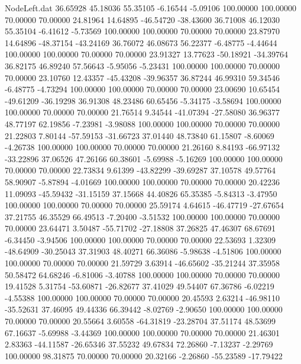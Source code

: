 \begin{filecontents}{NodeLeft.dat}
  36.65928   45.18036   55.35105    -6.16544   -5.09106  100.00000  100.00000   70.00000   70.00000   24.81964   14.64895  -46.54720  -38.43600
  36.71008   46.12030   55.35104    -6.41612   -5.73569  100.00000  100.00000   70.00000   70.00000   23.87970   14.64896  -48.37154  -43.24169
  36.76072   46.08673   56.22377    -6.48775   -4.44644  100.00000  100.00000   70.00000   70.00000   23.91327   13.77623  -50.18921  -34.39764
  36.82175   46.89240   57.56643    -5.95056   -5.23431  100.00000  100.00000   70.00000   70.00000   23.10760   12.43357  -45.43208  -39.96357
  36.87244   46.99310   59.34546    -6.48775   -4.73294  100.00000  100.00000   70.00000   70.00000   23.00690   10.65454  -49.61209  -36.19298
  36.91308   48.23486   60.65456    -5.34175   -3.58694  100.00000  100.00000   70.00000   70.00000   21.76514    9.34544  -41.07394  -27.58080
  36.96377   48.77197   62.19856    -7.23981   -3.98088  100.00000  100.00000   70.00000   70.00000   21.22803    7.80144  -57.59153  -31.66723
  37.01440   48.73840   61.15807    -8.60069   -4.26738  100.00000  100.00000   70.00000   70.00000   21.26160    8.84193  -66.97132  -33.22896
  37.06526   47.26166   60.38601    -5.69988   -5.16269  100.00000  100.00000   70.00000   70.00000   22.73834    9.61399  -43.82299  -39.69287
  37.10578   49.57764   58.90907    -5.87894   -4.01669  100.00000  100.00000   70.00000   70.00000   20.42236   11.09093  -45.59432  -31.15159
  37.15668   44.40826   65.35385    -5.84313   -3.47950  100.00000  100.00000   70.00000   70.00000   25.59174    4.64615  -46.47719  -27.67654
  37.21755   46.35529   66.49513    -7.20400   -3.51532  100.00000  100.00000   70.00000   70.00000   23.64471    3.50487  -55.71702  -27.18808
  37.26825   47.46307   68.67691    -6.34450   -3.94506  100.00000  100.00000   70.00000   70.00000   22.53693    1.32309  -48.64909  -30.25043
  37.31903   48.40271   66.36086    -5.98638   -4.51806  100.00000  100.00000   70.00000   70.00000   21.59729    3.63914  -46.65602  -35.21244
  37.35958   50.58472   64.68246    -6.81006   -3.40788  100.00000  100.00000   70.00000   70.00000   19.41528    5.31754  -53.60871  -26.82677
  37.41029   49.54407   67.36786    -6.02219   -4.55388  100.00000  100.00000   70.00000   70.00000   20.45593    2.63214  -46.98110  -35.52631
  37.46095   49.44336   66.39442    -8.02769   -2.90650  100.00000  100.00000   70.00000   70.00000   20.55664    3.60558  -64.31819  -23.28704
  37.51174   48.53699   67.16637    -5.69988   -3.44369  100.00000  100.00000   70.00000   70.00000   21.46301    2.83363  -44.11587  -26.65346
  37.55232   49.67834   72.26860    -7.13237   -2.29769  100.00000   98.31875   70.00000   70.00000   20.32166   -2.26860  -55.23589  -17.79422

\end{filecontents}
